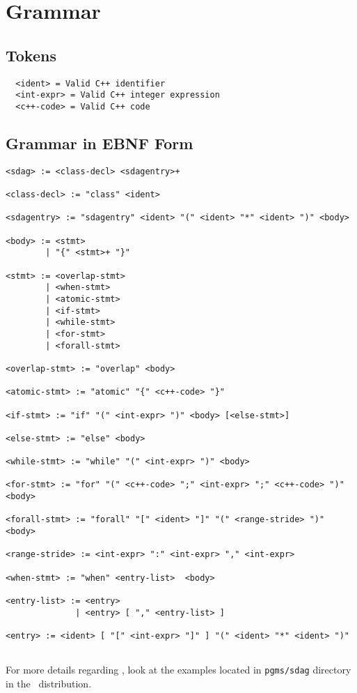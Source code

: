 \section{Grammar}

\subsection{Tokens}

\begin{verbatim}
  <ident> = Valid C++ identifier 
  <int-expr> = Valid C++ integer expression 
  <c++-code> = Valid C++ code 
\end{verbatim}

\subsection{Grammar in EBNF Form}

\begin{verbatim}
<sdag> := <class-decl> <sdagentry>+ 

<class-decl> := "class" <ident> 

<sdagentry> := "sdagentry" <ident> "(" <ident> "*" <ident> ")" <body> 

<body> := <stmt> 
        | "{" <stmt>+ "}" 

<stmt> := <overlap-stmt> 
        | <when-stmt> 
        | <atomic-stmt> 
        | <if-stmt> 
        | <while-stmt> 
        | <for-stmt> 
        | <forall-stmt> 

<overlap-stmt> := "overlap" <body> 

<atomic-stmt> := "atomic" "{" <c++-code> "}" 

<if-stmt> := "if" "(" <int-expr> ")" <body> [<else-stmt>] 

<else-stmt> := "else" <body> 

<while-stmt> := "while" "(" <int-expr> ")" <body> 

<for-stmt> := "for" "(" <c++-code> ";" <int-expr> ";" <c++-code> ")" <body> 

<forall-stmt> := "forall" "[" <ident> "]" "(" <range-stride> ")" <body> 

<range-stride> := <int-expr> ":" <int-expr> "," <int-expr> 

<when-stmt> := "when" <entry-list>  <body> 

<entry-list> := <entry> 
              | <entry> [ "," <entry-list> ] 

<entry> := <ident> [ "[" <int-expr> "]" ] "(" <ident> "*" <ident> ")" 
  
\end{verbatim}


For more details regarding \sdag, look at the examples located in
{\tt pgms/sdag} directory in the \charmpp\ distribution.



